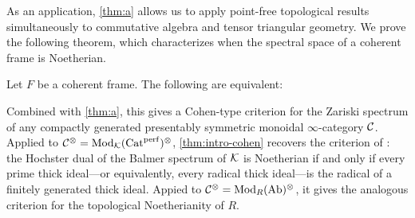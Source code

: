 \documentclass[10pt,a4paper,oneside]{article}
\begin{document}
As an application, \cref{thm:a} allows us to apply point-free topological results simultaneously to commutative algebra and tensor triangular geometry. We prove the following theorem, which characterizes when the spectral space of a coherent frame is Noetherian.
\begin{thm}\label{thm:intro-cohen}
Let $F$ be a coherent frame. The following are equivalent:
\end{thm}
Combined with \cref{thm:a}, this gives a Cohen-type criterion for the Zariski spectrum of any compactly generated presentably symmetric monoidal $\infty$-category $\mathcal{C}$. Applied to $\mathcal{C}^\otimes = \operatorname{Mod}_{\mathcal{K}}(\operatorname{Cat}^{\operatorname{perf}})^\otimes$, \cref{thm:intro-cohen} recovers the criterion of \cite{Barthel26}: the Hochster dual of the Balmer spectrum of $\mathcal{K}$ is Noetherian if and only if every prime thick ideal---or equivalently, every radical thick ideal---is the radical of a finitely generated thick ideal. Appied to $\mathcal{C}^\otimes = \operatorname{Mod}_{R}(\operatorname{Ab})^\otimes$, it gives the analogous criterion for the topological Noetherianity of $R$.
\end{document}
